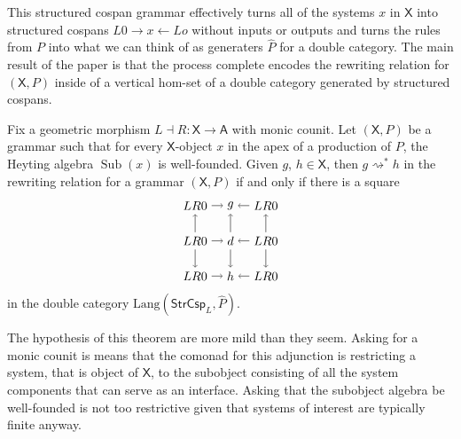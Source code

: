 \documentclass{amsart}
\newcommand{\A}{\cat{A}}
\newcommand{\X}{\cat{X}}
\newcommand{\StrCsp}{\cat{StrCsp}}
\newcommand{\Lang}{\mathrm{Lang}}
\newcommand{\cat}[1]{\mathsf{#1}}
\newcommand{\from}{\colon}
\newcommand{\deriv}[2]{#1 \rightsquigarrow^\ast #2}
\renewcommand{\gets}{\leftarrow}
\DeclareMathOperator{\Sub}{Sub}
\theoremstyle{remark}
\theoremstyle{definition}
\begin{document}
This structured cospan grammar effectively turns all of the systems $ x $
in $ \X $ into structured cospans $ L0 \to x \gets Lo $ without inputs
or outputs and turns the rules from $ P $ into what we can think of as
generaters $ \hat{P} $ for a double category.  The main result of the
paper is that the process complete encodes the rewriting relation for
$ ( \X,P ) $ inside of a vertical hom-set of a double category
generated by structured cospans.

\begin{theorem*}[\ref{thm:inductive-rewriting}]
  Fix a geometric morphism $ L \dashv R \from \X \to \A $ with monic
  counit. Let $ ( \X , P ) $ be a grammar such that for every
  $ \X $-object $ x $ in the apex of a production of $ P $, the
  Heyting algebra $ \Sub (x) $ is well-founded. Given $ g $,
  $ h \in \X $, then $ \deriv{g}{h} $ in the rewriting relation for a
  grammar $ ( \X , P ) $ if and only if there is a square
  \[
    \begin{tikzpicture}
      \node (1t) at (0,2) {$ LR 0 $};
      \node (2t) at (1,2) {$ g $};
      \node (3t) at (2,2) {$ LR 0 $};
      \node (1m) at (0,1) {$ LR 0 $};
      \node (2m) at (1,1) {$ d $};
      \node (3m) at (2,1) {$ LR 0 $};
      \node (1b) at (0,0) {$ LR 0 $};
      \node (2b) at (1,0) {$ h $};
      \node (3b) at (2,0) {$ LR 0 $};
      \draw [->] (1t) to node [] {\scriptsize{$  $}} (2t);
      \draw [->] (3t) to node [] {\scriptsize{$  $}} (2t);
      \draw [->] (1m) to node [] {\scriptsize{$  $}} (2m);
      \draw [->] (3m) to node [] {\scriptsize{$  $}} (2m);
      \draw [->] (1b) to node [] {\scriptsize{$  $}} (2b);
      \draw [->] (3b) to node [] {\scriptsize{$  $}} (2b);
      \draw [->] (1m) to node [] {\scriptsize{$  $}} (1t);
      \draw [->] (1m) to node [] {\scriptsize{$  $}} (1b);
      \draw [->] (2m) to node [] {\scriptsize{$  $}} (2t);
      \draw [->] (2m) to node [] {\scriptsize{$  $}} (2b);
      \draw [->] (3m) to node [] {\scriptsize{$  $}} (3t);
      \draw [->] (3m) to node [] {\scriptsize{$  $}} (3b);
    \end{tikzpicture}
  \]
  in the double category $ \Lang ( \StrCsp_L , \hat{P} ) $.
\end{theorem*}

The hypothesis of this theorem are more mild than they seem.  Asking
for a monic counit is means that the comonad for this adjunction is
restricting a system, that is object of $ \X $, to the subobject
consisting of all the system components that can serve as an
interface.  Asking that the subobject algebra be well-founded is not
too restrictive given that systems of interest are typically finite
anyway.
\end{document}
